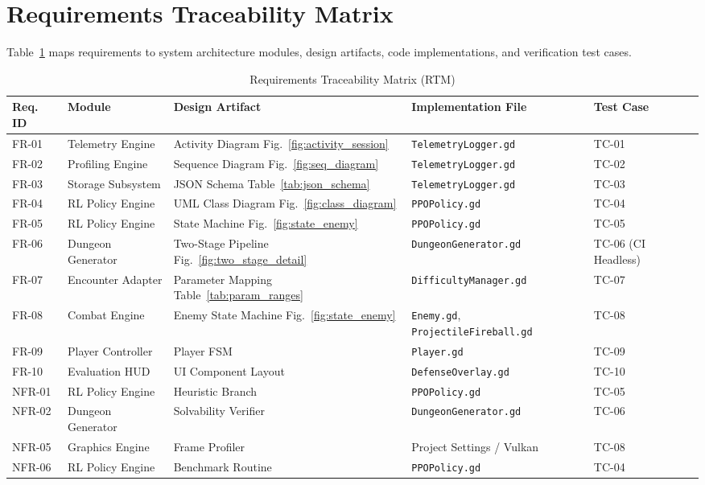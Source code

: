 \section{Requirements Traceability Matrix}
Table~\ref{tab:rtm} maps requirements to system architecture modules, design artifacts, code implementations, and verification test cases.

\begin{table}[!htbp]
\centering
\caption{Requirements Traceability Matrix (RTM)}
\label{tab:rtm}
\scriptsize
\begin{tabular}{p{}p{}p{}p{}p{}}
\toprule
\textbf{Req. ID} & \textbf{Module} & \textbf{Design Artifact} & \textbf{Implementation File} & \textbf{Test Case} \\
\midrule
FR-01 & Telemetry Engine & Activity Diagram Fig.~\ref{fig:activity_session} & \texttt{TelemetryLogger.gd} & TC-01 \\
FR-02 & Profiling Engine & Sequence Diagram Fig.~\ref{fig:seq_diagram} & \texttt{TelemetryLogger.gd} & TC-02 \\
FR-03 & Storage Subsystem & JSON Schema Table~\ref{tab:json_schema} & \texttt{TelemetryLogger.gd} & TC-03 \\
FR-04 & RL Policy Engine & UML Class Diagram Fig.~\ref{fig:class_diagram} & \texttt{PPOPolicy.gd} & TC-04 \\
FR-05 & RL Policy Engine & State Machine Fig.~\ref{fig:state_enemy} & \texttt{PPOPolicy.gd} & TC-05 \\
FR-06 & Dungeon Generator & Two-Stage Pipeline Fig.~\ref{fig:two_stage_detail} & \texttt{DungeonGenerator.gd} & TC-06 (CI Headless) \\
FR-07 & Encounter Adapter & Parameter Mapping Table~\ref{tab:param_ranges} & \texttt{DifficultyManager.gd} & TC-07 \\
FR-08 & Combat Engine & Enemy State Machine Fig.~\ref{fig:state_enemy} & \texttt{Enemy.gd}, \texttt{ProjectileFireball.gd} & TC-08 \\
FR-09 & Player Controller & Player FSM & \texttt{Player.gd} & TC-09 \\
FR-10 & Evaluation HUD & UI Component Layout & \texttt{DefenseOverlay.gd} & TC-10 \\
NFR-01 & RL Policy Engine & Heuristic Branch & \texttt{PPOPolicy.gd} & TC-05 \\
NFR-02 & Dungeon Generator & Solvability Verifier & \texttt{DungeonGenerator.gd} & TC-06 \\
NFR-05 & Graphics Engine & Frame Profiler & Project Settings / Vulkan & TC-08 \\
NFR-06 & RL Policy Engine & Benchmark Routine & \texttt{PPOPolicy.gd} & TC-04 \\
\bottomrule
\end{tabular}
\end{table}
